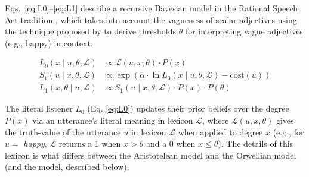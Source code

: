 \documentclass[floatsintext,doc]{apa6}
\begin{document}
Eqs.~\ref{eq:L0}--\ref{eq:L1} describe a recursive Bayesian model in the Rational Speech Act tradition \cite{Franke2015a, Goodman2016:RSA}, 
which takes into account the vagueness of scalar adjectives using the technique proposed by  to derive thresholds \(\theta\) for interpreting vague adjectives (e.g., happy) in context:


\begin{align}
L_{0}(x \mid u, \theta, \mathcal{L}) &\propto \mathcal{L}(u, x, \theta) \cdot P(x) \label{eq:L0} \\
S_{1}(u \mid x, \theta, \mathcal{L}) &\propto \exp{(\alpha \cdot \ln {L_{0}(x \mid u, \theta, \mathcal{L})} - \text{cost}(u))} \label{eq:S1}\\
L_{1}(x, \theta \mid u,  \mathcal{L}) &\propto S_{1}(u \mid x, \theta, \mathcal{L}) \cdot P(x) \cdot  P(\theta) \label{eq:L1}
\end{align}


The literal listener \(L_0\) (Eq. \ref{eq:L0}) updates their prior beliefs over the degree \(P(x)\) via an utterance's literal meaning in lexicon \(\mathcal{L}\),
where \(\mathcal{L}(u, x, \theta)\) gives the truth-value of the utterance \(u\) in lexicon \(\mathcal{L}\) when applied to degree \(x\) (e.g., for $u= $ \emph{happy}, $\mathcal{L}$ returns a 1 when $x>\theta$ and a 0 when  $x\leq\theta$).
The details of this lexicon is what differs between  the Aristotelean model and the Orwellian model (and the \ourmodel model, described below).
\end{document}
